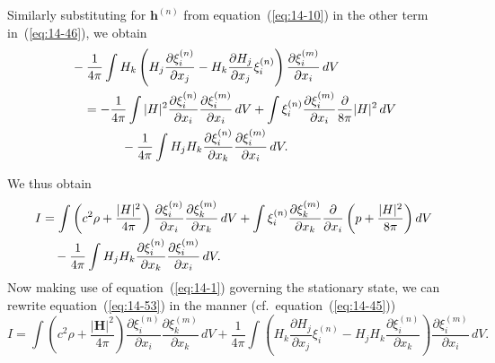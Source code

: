 Similarly substituting for $\mathbf{h}^{(n)}$ from equation~(\ref{eq:14-10}) in the other term in~(\ref{eq:14-46}), we obtain
\begin{align}
\label{eq:14-52}
&-\frac{1}{4\pi} \int H_k \left(H_j \frac{\partial \xi_i^{(n)}}{\partial x_j} - H_k \frac{\partial H_j}{\partial x_j} \xi_i^{(n)}\right) \frac{\partial \xi_i^{(m)}}{\partial x_i} \, dV \notag \\
&\quad = -\frac{1}{4\pi} \int |\mathbf{H}|^2 \frac{\partial \xi_i^{(n)}}{\partial x_i} \frac{\partial \xi_i^{(m)}}{\partial x_i} \, dV + \int \xi_i^{(n)} \frac{\partial \xi_i^{(m)}}{\partial x_i} \frac{\partial}{8\pi} |\mathbf{H}|^2 \, dV \notag \\
&\qquad\qquad - \frac{1}{4\pi} \int H_j H_k \frac{\partial \xi_i^{(n)}}{\partial x_k} \frac{\partial \xi_i^{(m)}}{\partial x_i} \, dV.
\end{align}

We thus obtain
\begin{align}
\label{eq:14-53}
I &= \int \left(c^2 \rho + \frac{|\mathbf{H}|^2}{4\pi}\right) \frac{\partial \xi_i^{(n)}}{\partial x_i} \frac{\partial \xi_k^{(m)}}{\partial x_k} \, dV + \int \xi_i^{(n)} \frac{\partial \xi_k^{(m)}}{\partial x_k} \frac{\partial}{\partial x_i} \left(p + \frac{|\mathbf{H}|^2}{8\pi}\right) dV \notag \\
&\quad - \frac{1}{4\pi} \int H_j H_k \frac{\partial \xi_i^{(n)}}{\partial x_k} \frac{\partial \xi_i^{(m)}}{\partial x_i} \, dV.
\end{align}
Now making use of equation~(\ref{eq:14-1}) governing the stationary state, we can rewrite equation~(\ref{eq:14-53}) in the manner (cf.\ equation~(\ref{eq:14-45}))
\begin{equation}
\label{eq:14-54}
I = \int \left(c^2 \rho + \frac{|\mathbf{H}|^2}{4\pi}\right) \frac{\partial \xi_i^{(n)}}{\partial x_i} \frac{\partial \xi_k^{(m)}}{\partial x_k} \, dV + \frac{1}{4\pi} \int \left(H_k \frac{\partial H_j}{\partial x_j} \xi_i^{(n)} - H_j H_k \frac{\partial \xi_i^{(n)}}{\partial x_k}\right) \frac{\partial \xi_i^{(m)}}{\partial x_i} \, dV.
\end{equation}

